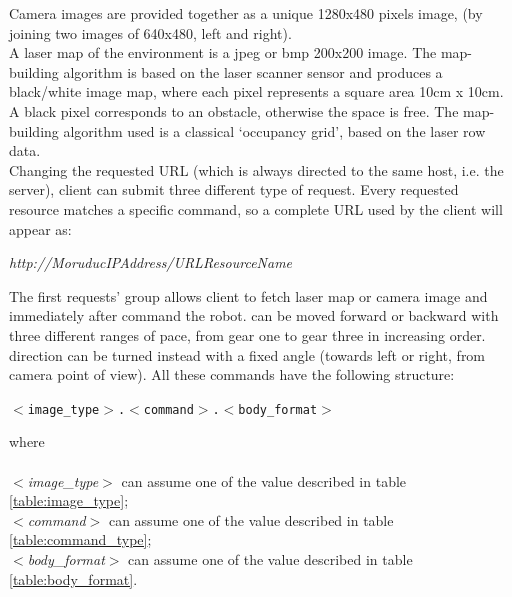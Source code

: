 Camera images are provided together as a unique 1280x480 pixels image, 
(by joining two images of 640x480, left and right).
\\
A laser map of the environment is a jpeg or bmp 200x200 image. The map-building
algorithm is based on the laser scanner sensor and produces a black/white image
map, where each pixel represents a square area 10cm x 10cm. A black pixel corresponds
to an obstacle, otherwise the space is free. The map-building algorithm used is a
classical `occupancy grid', based on the laser row data.
\\
Changing the requested URL (which is always directed to the same host,
i.e. the \morduc{} server), client can submit three different type of request.
Every requested resource matches a specific command, so a complete URL used
by the client will appear as:

\begin{center}
  \textit{http://MoruducIPAddress/URLResourceName}
\end{center}

The first requests' group allows client to fetch laser map or camera image and
immediately after command the robot. \morduc{} can be moved
forward or backward with three different ranges of pace, from gear one to
gear three in increasing order.
\morduc{} direction can be turned instead
with a fixed angle (towards left or right, from camera point
of view). All these commands have the following structure:

\begin{center}
  \texttt{$<$image\_type$>$.$<$command$>$.$<$body\_format$>$}
\end{center}

where \\ \\
\textit{$<$image\_type$>$} can assume one of the value described in table
\ref{table:image_type};\\
\textit{$<$command$>$} can assume one of the value described in table
\ref{table:command_type};\\
\textit{$<$body\_format$>$} can assume one of the value described in table
\ref{table:body_format}. \\

